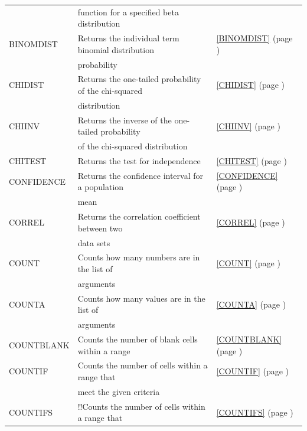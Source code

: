 \begin{center}
\begin{longtable}{l l l }
		& function for a specified beta distribution &   \\
		BINOMDIST & Returns the individual term binomial distribution &  \ref{BINOMDIST} (page \pageref{BINOMDIST}) \index{Spreadsheet Functions!BINOMDIST} \\
		& probability &   \\
		CHIDIST & Returns the one-tailed probability of the chi-squared &  \ref{CHIDIST} (page \pageref{CHIDIST}) \index{Spreadsheet Functions!CHIDIST} \\
		& distribution &   \\
		CHIINV & Returns the inverse of the one-tailed probability &  \ref{CHIINV} (page \pageref{CHIINV}) \index{Spreadsheet Functions!CHIINV} \\
		& of the chi-squared distribution &   \\
		CHITEST & Returns the test for independence &  \ref{CHITEST} (page \pageref{CHITEST}) \index{Spreadsheet Functions!CHITEST} \\
		CONFIDENCE & Returns the confidence interval for a population  &  \ref{CONFIDENCE} (page \pageref{CONFIDENCE}) \index{Spreadsheet Functions!CONFIDENCE} \\
		& mean &   \\
		CORREL & Returns the correlation coefficient between two &  \ref{CORREL} (page \pageref{CORREL}) \index{Spreadsheet Functions!CORREL} \\
		& data sets  &   \\
		COUNT & Counts how many numbers are in the list of  &  \ref{COUNT} (page \pageref{COUNT}) \index{Spreadsheet Functions!COUNT} \\
		& arguments  &   \\
		COUNTA & Counts how many values are in the list of &  \ref{COUNTA} (page \pageref{COUNTA}) \index{Spreadsheet Functions!COUNTA} \\
		& arguments  &   \\    
		COUNTBLANK & Counts the number of blank cells within a range &  \ref{COUNTBLANK} (page \pageref{COUNTBLANK}) \index{Spreadsheet Functions!COUNTBLANK} \\
		COUNTIF & Counts the number of cells within a range that &  \ref{COUNTIF} (page \pageref{COUNTIF}) \index{Spreadsheet Functions!COUNTIF} \\
		& meet the given criteria &   \\
		COUNTIFS & !!Counts the number of cells within a range that &  \ref{COUNTIFS} (page \pageref{COUNTIFS}) \index{Spreadsheet Functions!COUNTIFS} \\

\end{longtable}
\end{center}
